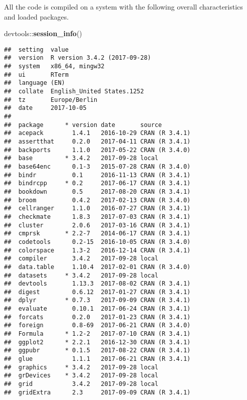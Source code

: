 \documentclass[]{book}
\newenvironment{Shaded}{\begin{snugshade}}{\end{snugshade}}
\newcommand{\KeywordTok}[1]{\textcolor[rgb]{0.13,0.29,0.53}{\textbf{{#1}}}}
\newcommand{\NormalTok}[1]{{#1}}
\theoremstyle{definition}
\theoremstyle{definition}
\theoremstyle{definition}
\theoremstyle{remark}
\begin{document}
All the code is compiled on a system with the following overall
characteristics and loaded packages.

\begin{Shaded}
\begin{Highlighting}[]
\NormalTok{devtools::}\KeywordTok{session_info}\NormalTok{()}
\end{Highlighting}
\end{Shaded}

\begin{verbatim}
##  setting  value                       
##  version  R version 3.4.2 (2017-09-28)
##  system   x86_64, mingw32             
##  ui       RTerm                       
##  language (EN)                        
##  collate  English_United States.1252  
##  tz       Europe/Berlin               
##  date     2017-10-05                  
## 
##  package      * version date       source        
##  acepack        1.4.1   2016-10-29 CRAN (R 3.4.1)
##  assertthat     0.2.0   2017-04-11 CRAN (R 3.4.1)
##  backports      1.1.0   2017-05-22 CRAN (R 3.4.0)
##  base         * 3.4.2   2017-09-28 local         
##  base64enc      0.1-3   2015-07-28 CRAN (R 3.4.0)
##  bindr          0.1     2016-11-13 CRAN (R 3.4.1)
##  bindrcpp     * 0.2     2017-06-17 CRAN (R 3.4.1)
##  bookdown       0.5     2017-08-20 CRAN (R 3.4.1)
##  broom          0.4.2   2017-02-13 CRAN (R 3.4.0)
##  cellranger     1.1.0   2016-07-27 CRAN (R 3.4.1)
##  checkmate      1.8.3   2017-07-03 CRAN (R 3.4.1)
##  cluster        2.0.6   2017-03-16 CRAN (R 3.4.1)
##  cmprsk       * 2.2-7   2014-06-17 CRAN (R 3.4.1)
##  codetools      0.2-15  2016-10-05 CRAN (R 3.4.0)
##  colorspace     1.3-2   2016-12-14 CRAN (R 3.4.1)
##  compiler       3.4.2   2017-09-28 local         
##  data.table     1.10.4  2017-02-01 CRAN (R 3.4.0)
##  datasets     * 3.4.2   2017-09-28 local         
##  devtools       1.13.3  2017-08-02 CRAN (R 3.4.1)
##  digest         0.6.12  2017-01-27 CRAN (R 3.4.1)
##  dplyr        * 0.7.3   2017-09-09 CRAN (R 3.4.1)
##  evaluate       0.10.1  2017-06-24 CRAN (R 3.4.1)
##  forcats        0.2.0   2017-01-23 CRAN (R 3.4.1)
##  foreign        0.8-69  2017-06-21 CRAN (R 3.4.0)
##  Formula      * 1.2-2   2017-07-10 CRAN (R 3.4.1)
##  ggplot2      * 2.2.1   2016-12-30 CRAN (R 3.4.1)
##  ggpubr       * 0.1.5   2017-08-22 CRAN (R 3.4.1)
##  glue           1.1.1   2017-06-21 CRAN (R 3.4.1)
##  graphics     * 3.4.2   2017-09-28 local         
##  grDevices    * 3.4.2   2017-09-28 local         
##  grid           3.4.2   2017-09-28 local         
##  gridExtra      2.3     2017-09-09 CRAN (R 3.4.1)

\end{verbatim}
\end{document}
